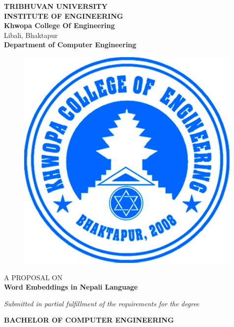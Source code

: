 \begin{center}
	\thispagestyle{empty}
	\Large\textbf{TRIBHUVAN UNIVERSITY}\\
	\Large\textbf{INSTITUTE OF ENGINEERING }\\
	\vspace{0.2in}
	\large{\textbf{Khwopa College Of Engineering}\\}
	\normalsize{Libali, Bhaktapur\\}
	\large\textbf{Department of Computer Engineering}
	\vspace{0.2in}
	\begin{figure}[h]
		\centering
			\includegraphics{img/Khwopalogo.jpg}
	\end{figure}
	
	\vspace{0.2in}
	\large{A PROPOSAL ON\\\textbf{Word Embeddings in Nepali Language}\\}
	
	\vspace{0.2in}
	\large{\textit{Submitted in partial fulfillment of the requirements for the degree\\}}
	
	\vspace{0.2in}
	\large{\textbf{BACHELOR OF COMPUTER ENGINEERING}\\}
	

\end{center}
